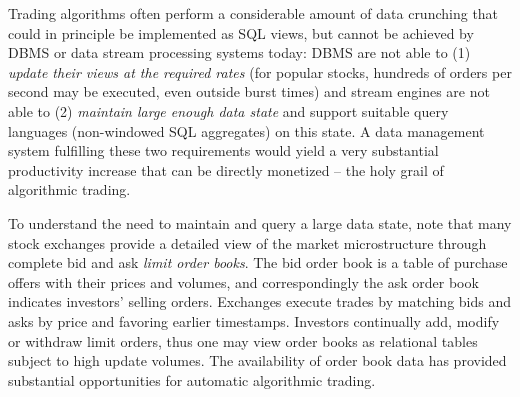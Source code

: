 
Trading algorithms often perform a considerable amount of data crunching that
could in principle be implemented as SQL views, but cannot be achieved by DBMS
or data stream processing systems today: DBMS are not able to (1) {\em update
their views at the required rates}\/ (for popular stocks, hundreds of orders per
second may be executed, even outside burst times) and stream engines are not
able to (2) {\em maintain large enough data state}\/ and support suitable query
languages (non-windowed SQL aggregates) on this state.
A data management system fulfilling these two requirements would yield a very
substantial productivity increase that can be directly monetized -- the holy
grail of algorithmic trading.



To understand the need to maintain and query a large data state, note that
many stock exchanges provide a detailed view of the market microstructure
through complete bid and ask {\em limit order books}. The bid order book is a
table of purchase offers with their prices and volumes, and correspondingly the
ask order book indicates investors' selling orders. Exchanges execute trades by
matching bids and asks by price and favoring earlier timestamps. Investors
continually add, modify or withdraw limit orders, thus one may view order books
as relational tables subject to high update volumes. The availability of order
book data has provided substantial opportunities for automatic algorithmic
trading.


